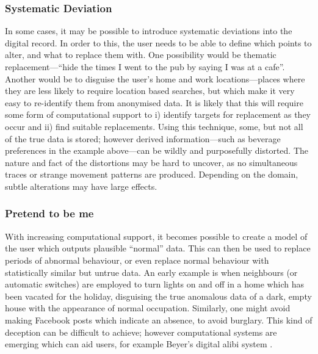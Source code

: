 \documentclass{IOS-Book-Article}     %
\newcommand{\tbox}[3][red]{{
\color{#1}\noindent{
   \fbox{\scriptsize{ {\bf #2} \textsl{#3}}}
   \vspace{2pt}
}
}}
\newcommand{\todo}[1]{\tbox{TODO:}{#1}}
\begin{document}
\subsubsection{Systematic Deviation}

In some cases, it may be possible to introduce systematic deviations into the
digital record. In order to this, the user needs to be able to define which
points to alter, and what to replace them with. One possibility would be
thematic replacement---``hide the times I went to the pub by saying I
was at a cafe''. Another would be to disguise the user's home and work
locations---places where they are less likely to require location based
searches, but which make it very easy to re-identify them from anonymised data.
It is likely that this will require some form of computational support to i) identify targets for replacement as they occur and ii) find suitable replacements. Using this technique, some, but not all of the true data is stored; however derived information---such as beverage preferences in the
example above---can be wildly and purposefully distorted. The nature and fact of
the distortions may be hard to uncover, as no simultaneous traces or
strange movement patterns are produced. Depending on the domain, subtle
alterations may have large effects.
\todo{examples?}

\subsubsection{Pretend to be me}

With increasing computational support, it becomes possible to create a model of
the user which outputs plausible ``normal'' data. This can then be used to
replace periods of abnormal behaviour, or even replace normal behaviour with
statistically similar but untrue data. An early example is when neighbours (or
automatic switches) are employed to turn lights on and off in a home which has
been vacated for the holiday, disguising the true anomalous data of a dark,
empty house with the appearance of normal occupation. Similarly, one might avoid
making Facebook posts which indicate an absence, to avoid burglary. This kind of
deception can be difficult to achieve; however computational systems are
emerging which can aid users, for example Beyer's digital alibi system
\cite{beyer2014Alibi}.
\end{document}
